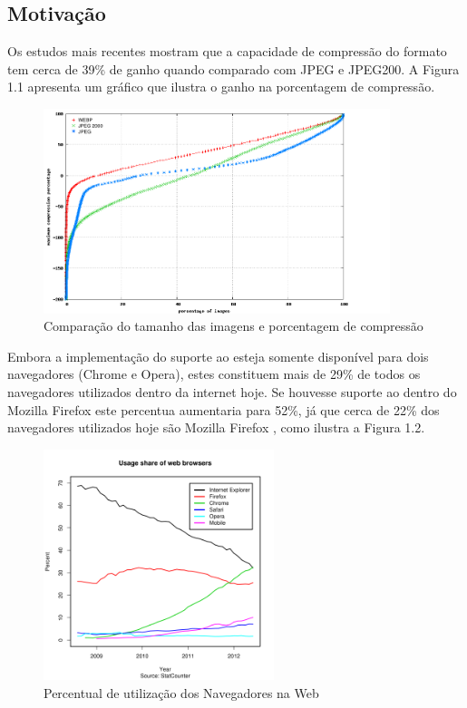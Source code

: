 \documentclass[espaco=simples,appendix=Name]{abnt}
\begin{document}
\begin{description}
\section{Motivação}

\item \noindent Os estudos mais recentes mostram que a capacidade de compressão do formato  tem cerca de 39\% de ganho quando comparado com JPEG e JPEG200. A Figura 1.1 apresenta um gráfico que ilustra o ganho na porcentagem de compressão.

\begin{figure}[H]
  \centering
    \includegraphics[width=0.9\textwidth]{Plot3_cdfcompr.png}
  \caption{Comparação do tamanho das imagens e porcentagem de compressão \protect\cite{WebPStudy}}
\end{figure}

Embora a implementação do suporte ao  esteja somente disponível para dois navegadores (Chrome e Opera), estes constituem mais de 29\% de todos os navegadores utilizados dentro da internet hoje. Se houvesse suporte ao  dentro do Mozilla Firefox este percentua aumentaria para 52\%, já que cerca de 22\% dos navegadores utilizados hoje são Mozilla Firefox \cite{BrowserStats}, como ilustra a Figura 1.2.

\begin{figure}[H]
  \centering
    \includegraphics[width=0.6\textwidth]{BrowserCounter.png}
  \caption{Percentual de utilização dos Navegadores na Web \protect\cite{BrowserStats}}
\end{figure}


\end{description}
\end{document}
